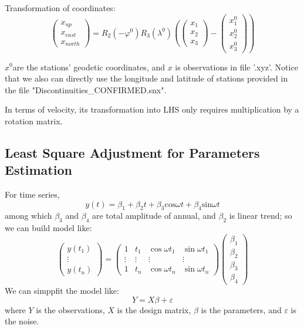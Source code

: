 \documentclass{article}
\begin{document}
Transformation of coordinates: \vspace{5pt}
$$\left.\begin{pmatrix}x_{up}\\x_{east}\\x_{north}\end{pmatrix}=R_2(-\varphi^0)R_3(\lambda^0)\left(\begin{pmatrix}x_1\\x_2\\x_3\end{pmatrix}\right.-\begin{pmatrix}x_1^0\\x_2^0\\x_3^0\end{pmatrix}\right)$$

$x^0$are the stations' geodetic coordinates, and $x$ is observations in file '.xyz'.
Notice that we also can directly use the longitude and latitude of stations provided in the file "Discontinuities\_CONFIRMED.snx".

In terms of velocity, its transformation into LHS only requires multiplication by a rotation matrix.
\subsection{Least Square Adjustment for Parameters Estimation}
For time series,\vspace{4pt} $$ y(t)=\beta_{1}+\beta_{2}t+\beta_{3}\mathrm{cos}\omega t+\beta_{4}\mathrm{sin}\omega t $$
among which $\beta_3$ and $\beta_4$ are total amplitude of annual, and $\beta_2$ is linear trend; so we can build model like: \vspace{6pt}
$$\begin{pmatrix}y(t_1)\\\vdots\\y(t_n)\end{pmatrix}=\begin{pmatrix}1&t_1&\cos\omega t_1&\sin\omega t_1\\\vdots&\vdots&\vdots&\vdots\\1&t_n&\cos\omega t_n&\sin\omega t_n\end{pmatrix}\begin{pmatrix}\beta_1\\\beta_2\\\beta_3\\\beta_4\end{pmatrix}$$
\vspace{4pt}
We can simppfit the model like:
\vspace{4pt} $$Y=X\beta+\varepsilon$$
where $Y$ is the observations, $X$ is the design matrix, $\beta$ is the parameters, and $\varepsilon$ is the noise.
\end{document}
